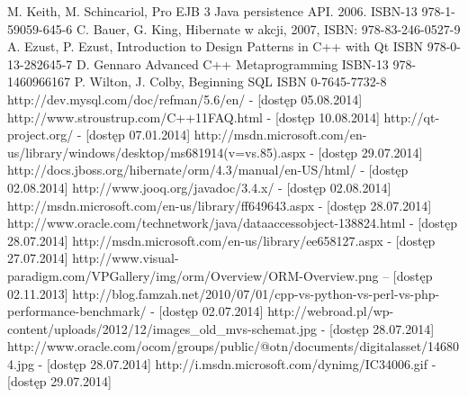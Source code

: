 \documentclass[12pt]{report}
\begin{document}
\begin{thebibliography}{99}
	 {M. Keith, M. Schincariol, Pro EJB 3 Java persistence API. 2006. ISBN-13 978-1-59059-645-6}
	 {C. Bauer, G. King, Hibernate w akcji, 2007, ISBN: 978-83-246-0527-9}
	 {A. Ezust, P. Ezust, Introduction to Design Patterns in C++ with Qt ISBN 978-0-13-282645-7}
	 {D. Gennaro Advanced C++ Metaprogramming ISBN-13 978-1460966167}
	 {P. Wilton, J. Colby, Beginning SQL ISBN 0-7645-7732-8}
	 {http://dev.mysql.com/doc/refman/5.6/en/ - [dostęp 05.08.2014]}
	 {http://www.stroustrup.com/C++11FAQ.html - [dostęp 10.08.2014]}
	 {http://qt-project.org/ - [dostęp 07.01.2014]}
	 {http://msdn.microsoft.com/en-us/library/windows/desktop/ms681914(v=vs.85).aspx - [dostęp 29.07.2014]}
	 {http://docs.jboss.org/hibernate/orm/4.3/manual/en-US/html/ - [dostęp 02.08.2014]}
	 {http://www.jooq.org/javadoc/3.4.x/ - [dostęp 02.08.2014]}
	 {http://msdn.microsoft.com/en-us/library/ff649643.aspx - [dostęp 28.07.2014]}
	 {http://www.oracle.com/technetwork/java/dataaccessobject-138824.html - [dostęp 28.07.2014]}
	 {http://msdn.microsoft.com/en-us/library/ee658127.aspx - [dostęp 27.07.2014]}
	 http://www.visual-paradigm.com/VPGallery/img/orm/Overview/ORM-Overview.png --  [dostęp 02.11.2013]
	 http://blog.famzah.net/2010/07/01/cpp-vs-python-vs-perl-vs-php-performance-benchmark/ - [dostęp 02.07.2014]
	 {http://webroad.pl/wp-content/uploads/2012/12/images\_old\_mvs-schemat.jpg - [dostęp 28.07.2014]}
	 {http://www.oracle.com/ocom/groups/public/@otn/documents/digitalasset/146804.jpg - [dostęp 28.07.2014]}
	 {http://i.msdn.microsoft.com/dynimg/IC34006.gif - [dostęp 29.07.2014]}
\end{thebibliography}

\listoffigures

\listoftables
\end{document}
